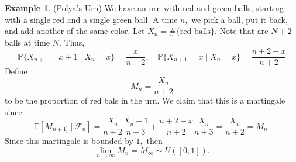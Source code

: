 \documentclass[10pt, oneside]{article}
\newcommand{\bbP}{\mathbb{P}}
\newcommand{\bbE}{\mathbb{E}}
\theoremstyle{definition}
\newtheorem{exmp}{Example}[section]
\begin{document}
\begin{exmp}
    (Polya's Urn) We have an urn with red and green balls, starting with a single red and a single green ball. A time $n,$ we pick a ball, put it back, and add another of the same color. Let $X_n = \#\{\text{red balls}\}.$ Note that are $N + 2$ balls at time $N.$ Thus,
    \[\bbP\{X_{n + 1} = x+1 \mid X_n = x\} = \frac{x}{n+2}, \quad \bbP\{X_{n+ 1} = x \mid X_n = x\} = \frac{n + 2 - x}{n+2}\] Define 
    \[M_n = \frac{X_n}{n+2}\] to be the proportion of red bals in the urn. We claim that this is a martingale since 
    \[\bbE[M_{n+1]} \mid \mathcal{F}_n] = \frac{X_n}{n+2}\frac{X_n + 1}{n+3} + \frac{n+2 - x}{n+2}\frac{X_n}{n+3} = \frac{X_n}{n+2} = M_n.\] Since this martingale is bounded by $1,$ then 
    \[\lim_{n\to \infty} M_n = M_\infty \sim U([0,1]).\]
\end{exmp}

\newpage
\end{document}
